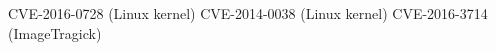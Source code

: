 \documentclass[12 pt]{beamer}
\begin{document}





CVE-2016-0728 (Linux kernel)
CVE-2014-0038 (Linux kernel)
CVE-2016-3714 (ImageTragick)
\end{document}
